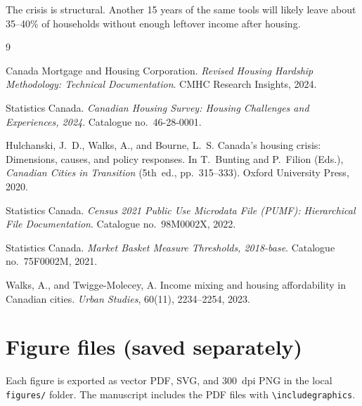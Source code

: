 \documentclass[11pt,letterpaper]{article}
\begin{document}
The crisis is structural.
Another 15 years of the same tools will likely leave about 35--40\% of households without enough leftover income after housing.

\begin{thebibliography}{9}

Canada Mortgage and Housing Corporation.
\newblock \emph{Revised Housing Hardship Methodology: Technical Documentation}.
\newblock CMHC Research Insights, 2024.

Statistics Canada.
\newblock \emph{Canadian Housing Survey: Housing Challenges and Experiences, 2024}.
\newblock Catalogue no.~46-28-0001.

Hulchanski, J.~D., Walks, A., and Bourne, L.~S.
\newblock Canada's housing crisis: Dimensions, causes, and policy responses.
\newblock In T.~Bunting and P.~Filion (Eds.), \emph{Canadian Cities in Transition} (5th~ed., pp.~315--333).
\newblock Oxford University Press, 2020.

Statistics Canada.
\newblock \emph{Census 2021 Public Use Microdata File (PUMF): Hierarchical File Documentation}.
\newblock Catalogue no.~98M0002X, 2022.

Statistics Canada.
\newblock \emph{Market Basket Measure Thresholds, 2018-base}.
\newblock Catalogue no.~75F0002M, 2021.

Walks, A., and Twigge-Molecey, A.
\newblock Income mixing and housing affordability in Canadian cities.
\newblock \emph{Urban Studies}, 60(11), 2234--2254, 2023.

\end{thebibliography}

\appendix
\section{Figure files (saved separately)}
\label{app:figures}

Each figure is exported as vector PDF, SVG, and 300~dpi PNG in the local \texttt{figures/} folder.
The manuscript includes the PDF files with \texttt{\textbackslash includegraphics}.
\end{document}
